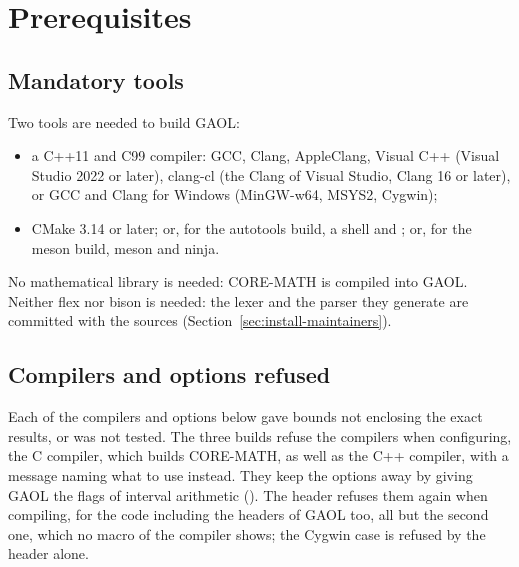 \documentclass[12pt,a4paper,twoside,openright]{book}
\begin{document}
\section{Prerequisites}

\subsection{Mandatory tools}
%

Two tools are needed to build GAOL:
\begin{itemize}
\item a C++11 and C99 compiler: GCC, Clang, AppleClang, Visual C++ (Visual
  Studio 2022 or later), clang-cl (the Clang of Visual Studio, Clang 16 or
  later), or GCC and Clang for Windows (MinGW-w64, MSYS2, Cygwin);
%
\item CMake 3.14 or later; or, for the autotools build, a shell and
  ; or, for the meson build, meson and ninja.
\end{itemize}

\noindent
No mathematical library is needed: CORE-MATH is compiled into GAOL. Neither
flex nor bison is needed: the lexer and the parser they generate are committed
with the sources (Section~\ref{sec:install-maintainers}).

\subsection{Compilers and options refused}\label{sec:refused}
%

Each of the compilers and options below gave bounds not enclosing the exact
results, or was not tested. The three builds refuse the compilers when
configuring, the C compiler, which builds CORE-MATH, as well as the C++
compiler, with a message naming what to use instead. They keep the options
away by giving GAOL the flags of interval arithmetic ().
The header  refuses them again when compiling, for
the code including the headers of GAOL too, all but the second one, which no
macro of the compiler shows; the Cygwin case is refused by the header alone.
\end{document}
